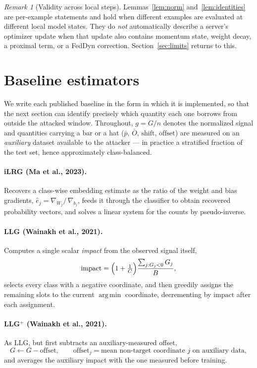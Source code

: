 \documentclass[11pt]{article}
\theoremstyle{remark}
\newtheorem{remark}{Remark}
\DeclareMathOperator*{\argmin}{arg\,min}
\begin{document}
\begin{remark}[Validity across local steps]
Lemmas~\ref{lem:norm} and~\ref{lem:identities} are per-example statements and
hold when different examples are evaluated at different local model states.
They do \emph{not} automatically describe a server's optimizer update when
that update also contains momentum state, weight decay, a proximal term, or a
FedDyn correction. Section~\ref{sec:limits} returns to this.
\end{remark}

\section{Baseline estimators}
\label{sec:baselines}

We write each published baseline in the form in which it is implemented, so
that the next section can identify precisely which quantity each one borrows
from outside the attacked window. Throughout, $g = G/n$ denotes the
normalized signal and quantities carrying a bar or a hat
($\bar p$, $\bar O$, $\mathrm{shift}$, $\mathrm{offset}$) are measured on an
\emph{auxiliary} dataset available to the attacker --- in practice a
stratified fraction of the test set, hence approximately class-balanced.

\paragraph{iLRG (Ma et al., 2023).}
Recovers a class-wise embedding estimate as the ratio of the weight and bias
gradients, $\hat e_j = \nabla_{W_j}\!/\,\nabla_{b_j}$, feeds it through the
classifier to obtain recovered probability vectors, and solves a linear
system for the counts by pseudo-inverse.

\paragraph{LLG (Wainakh et al., 2021).}
Computes a single scalar \emph{impact} from the observed signal itself,
\[
 \mathrm{impact} = \Bigl(1 + \tfrac1C\Bigr)\frac{\sum_{j : G_j<0} G_j}{B},
\]
selects every class with a negative coordinate, and then greedily assigns the
remaining slots to the current $\argmin$ coordinate, decrementing by
$\mathrm{impact}$ after each assignment.

\paragraph{LLG$^+$ (Wainakh et al., 2021).}
As LLG, but first subtracts an auxiliary-measured offset,
\[
 G \longleftarrow G - \mathrm{offset}, \qquad
 \mathrm{offset}_j = \text{mean non-target coordinate $j$ on auxiliary data},
\]
and averages the auxiliary impact with the one measured before training.
\end{document}
